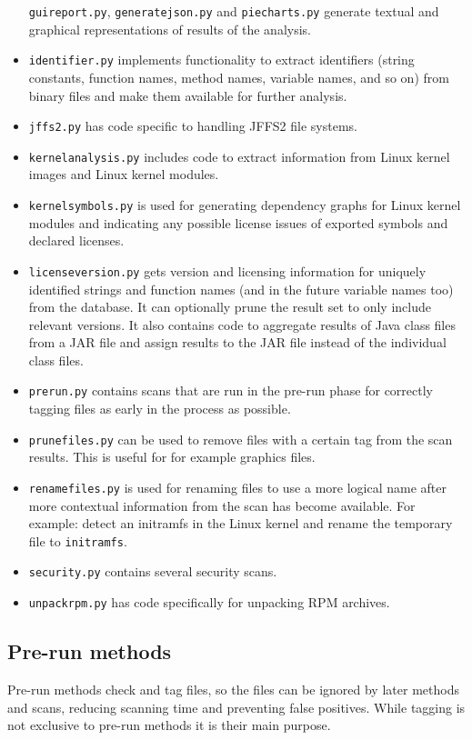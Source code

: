 \documentclass[10pt,a4paper]{article}
\begin{document}
\begin{itemize}
\texttt{guireport.py}, \texttt{generatejson.py} and \texttt{piecharts.py}
generate textual and graphical representations of results of the analysis.
\item \texttt{identifier.py} implements functionality to extract identifiers
(string constants, function names, method names, variable names, and so on)
from binary files and make them available for further analysis.
\item \texttt{jffs2.py} has code specific to handling JFFS2 file systems.
\item \texttt{kernelanalysis.py} includes code to extract information from
Linux kernel images and Linux kernel modules.
\item \texttt{kernelsymbols.py} is used for generating dependency graphs for
Linux kernel modules and indicating any possible license issues of exported
symbols and declared licenses.
\item \texttt{licenseversion.py} gets version and licensing information for
uniquely identified strings and function names (and in the future variable names
too) from the database. It can optionally prune the result set to only include
relevant versions. It also contains code to aggregate results of Java class
files from a JAR file and assign results to the JAR file instead of the
individual class files.
\item \texttt{prerun.py} contains scans that are run in the pre-run phase for
correctly tagging files as early in the process as possible.
\item \texttt{prunefiles.py} can be used to remove files with a certain tag
from the scan results. This is useful for for example graphics files.
\item \texttt{renamefiles.py} is used for renaming files to use a more logical
name after more contextual information from the scan has become available. For
example: detect an initramfs in the Linux kernel and rename the temporary file
to \texttt{initramfs}.
\item \texttt{security.py} contains several security scans.
\item \texttt{unpackrpm.py} has code specifically for unpacking RPM archives.
\end{itemize}

\subsection{Pre-run methods}

Pre-run methods check and tag files, so the files can be ignored by later
methods and scans, reducing scanning time and preventing false positives. While
tagging is not exclusive to pre-run methods it is their main purpose.
\end{document}
